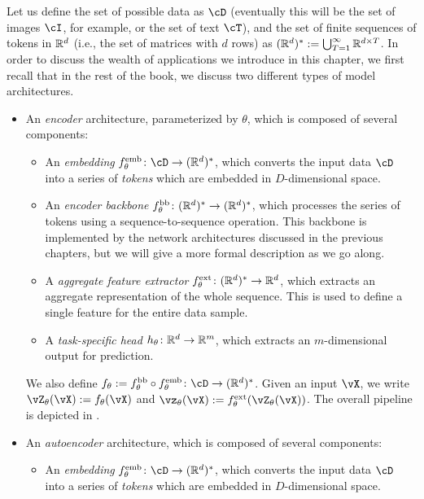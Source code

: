 \documentclass[\toplevelprefix/book-main.tex]{subfiles}
\begin{document}
Let us define the set of possible data as \(\cD\) (eventually this will be the set of images \(\cI\), for example, or the set of text \(\cT\)), and the set of finite sequences of tokens in \(\mathbb{R}^{d}\) (i.e., the set of matrices with \(d\) rows) as \((\mathbb{R}^{d})^{*} := \bigcup_{T = 1}^{\infty}\mathbb{R}^{d \times T}\). In order to discuss the wealth of applications we introduce in this chapter, we first recall that in the rest of the book, we discuss two different types of model architectures.
\begin{itemize}
    \item An \textit{encoder} architecture, parameterized by \(\theta\), which is composed of several components:
    \begin{itemize}
        \item An \textit{embedding} \(f_{\theta}^{\emb} \colon \cD \to (\R^{d})^{*}\), which converts the input data \(\cD\) into a series of \textit{tokens} which are embedded in \(D\)-dimensional space.
        \item An \textit{encoder backbone} \(f_{\theta}^{\mathrm{bb}} \colon (\mathbb{R}^{d})^{*} \to (\mathbb{R}^{d})^{*}\), which processes the series of tokens using a sequence-to-sequence operation. This backbone is implemented by the network architectures discussed in the previous chapters, but we will give a more formal description as we go along.
        \item A \textit{aggregate feature extractor} \(f_{\theta}^{\mathrm{ext}} \colon (\mathbb{R}^{d})^{*} \to \mathbb{R}^{d}\), which extracts an aggregate representation of the whole sequence. This is used to define a single feature for the entire data sample.
        \item A \textit{task-specific head} \(h_{\theta} \colon \mathbb{R}^{d} \to \mathbb{R}^{m}\), which extracts an \(m\)-dimensional output for prediction.
    \end{itemize}
    We also define \(f_{\theta} := f_{\theta}^{\backbone} \circ f_{\theta}^{\emb} \colon \cD \to (\R^{d})^{*}\). Given an input \(\vX\), we write \(\vZ_{\theta}(\vX) := f_{\theta}(\vX)\) and \(\vz_{\theta}(\vX) := f_{\theta}^{\ext}(\vZ_{\theta}(\vX))\). The overall pipeline is depicted in .
    \item An \textit{autoencoder} architecture, which is composed of several components:
    \begin{itemize}
        \item An \textit{embedding} \(f_{\theta}^{\emb} \colon \cD \to (\R^{d})^{*}\), which converts the input data \(\cD\) into a series of \textit{tokens} which are embedded in \(D\)-dimensional space.

\end{itemize}
\end{itemize}
\end{document}
